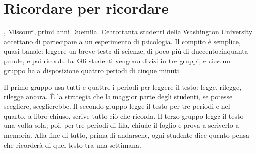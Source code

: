 %
\chapter{Ricordare per ricordare}
\label{cap:recupero}


, Missouri, primi anni Duemila. Centottanta
studenti della Washington University accettano di partecipare a un
esperimento di psicologia. Il compito è semplice, quasi banale: leggere
un breve testo di scienze, di poco più di duecentocinquanta parole, e
poi ricordarlo. Gli studenti vengono divisi in tre gruppi, e ciascun
gruppo ha a disposizione quattro periodi di cinque minuti.

Il primo gruppo usa tutti e quattro i periodi per leggere il testo:
legge, rilegge, rilegge ancora. È la strategia che la maggior parte
degli studenti, se potesse scegliere, sceglierebbe. Il secondo gruppo
legge il testo per tre periodi e nel quarto, a libro chiuso, scrive
tutto ciò che ricorda. Il terzo gruppo legge il testo una volta sola;
poi, per tre periodi di fila, chiude il foglio e prova a scriverlo a
memoria. Alla fine di tutto, prima di andarsene, ogni studente dice
quanto pensa che ricorderà di quel testo tra una settimana.

